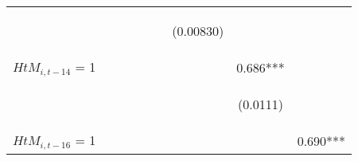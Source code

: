 \begin{center}
\begin{tabular}{lcccccccc}
\vspace{4pt} & \begin{footnotesize}\end{footnotesize} & \begin{footnotesize}\end{footnotesize} & \begin{footnotesize}\end{footnotesize} & \begin{footnotesize}\end{footnotesize} & \begin{footnotesize}\end{footnotesize} & \begin{footnotesize}(0.00830)\end{footnotesize} & \begin{footnotesize}\end{footnotesize} & \begin{footnotesize}\end{footnotesize} \\
$ {HtM}_{i, t-14} $ = 1 &  &  &  &  &  &  & 0.686*** &  \\
\vspace{4pt} & \begin{footnotesize}\end{footnotesize} & \begin{footnotesize}\end{footnotesize} & \begin{footnotesize}\end{footnotesize} & \begin{footnotesize}\end{footnotesize} & \begin{footnotesize}\end{footnotesize} & \begin{footnotesize}\end{footnotesize} & \begin{footnotesize}(0.0111)\end{footnotesize} & \begin{footnotesize}\end{footnotesize} \\
$ {HtM}_{i, t-16} $ = 1 &  &  &  &  &  &  &  & 0.690*** \\

\end{tabular}
\end{center}
